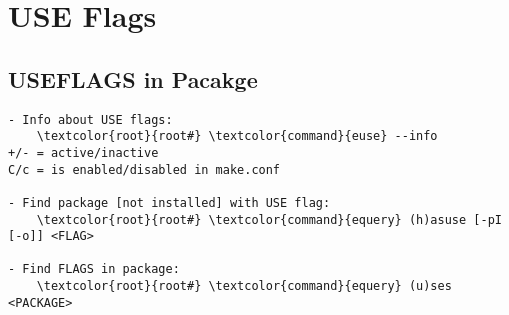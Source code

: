 \documentclass[10pt, a4paper, onecolumn, openany]{book}         %
\begin{document}
\section{USE Flags}
\subsection{USEFLAGS in Pacakge}
\begin{Verbatim}[commandchars=\\\{\}]
- Info about USE flags:
    \textcolor{root}{root#} \textcolor{command}{euse} --info
+/- = active/inactive
C/c = is enabled/disabled in make.conf

- Find package [not installed] with USE flag:
    \textcolor{root}{root#} \textcolor{command}{equery} (h)asuse [-pI [-o]] <FLAG>
    
- Find FLAGS in package:
    \textcolor{root}{root#} \textcolor{command}{equery} (u)ses <PACKAGE>
\end{Verbatim}
\end{document}
